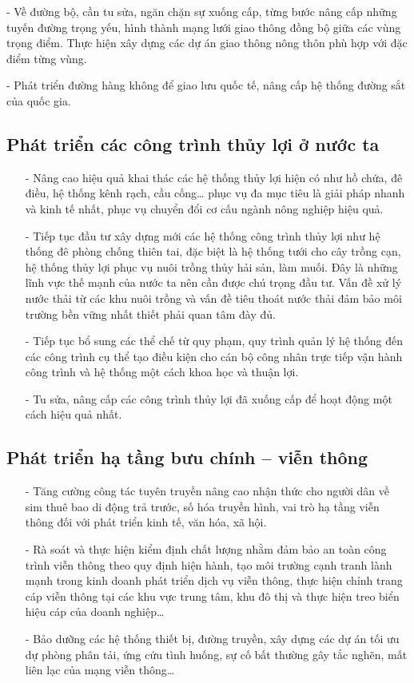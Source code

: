 - Về đường bộ, cần tu sửa, ngăn chặn sự xuống cấp, từng bước nâng cấp những tuyến đường trọng yếu, hình thành mạng lưới giao thông đồng bộ giữa các vùng trọng điểm. Thực hiện  xây dựng các dự án giao thông nông thôn phù hợp với đặc điểm từng vùng.

- Phát triển đường hàng không để giao lưu quốc tế, nâng cấp hệ thống đường sắt của quốc gia.

\subsection{Phát triển các công trình thủy lợi ở nước ta}
\begin{itemize}
\item[-] Nâng cao hiệu quả khai thác các hệ thống thủy lợi hiện có như hồ chứa, đê điều, hệ thống kênh rạch, cầu cống… phục vụ đa mục tiêu là giải pháp nhanh và kinh tế nhất, phục vụ chuyển đổi cơ cấu ngành nông nghiệp hiệu quả. 

\item[-] Tiếp tục đầu tư xây dựng mới các hệ thống công trình thủy lợi như hệ thống đê phòng chống thiên tai, đặc biệt là hệ thống tưới cho cây trồng cạn, hệ thống thủy lợi phục vụ nuôi trồng thủy hải sản, làm muối. Đây là những lĩnh vực thế mạnh của nước ta nên cần được chú trọng đầu tư. Vấn đề xử lý nước thải từ các khu nuôi trồng và vấn đề tiêu thoát nước thải đảm bảo môi trường bền vững nhất thiết phải quan tâm đày đủ.

\item[-] Tiếp tục bổ sung các thể chế từ quy phạm, quy trình quản lý hệ thống đến các công trình cụ thể tạo điều kiện cho cán bộ công nhân trực tiếp vận hành công trình và hệ thống một cách khoa học và thuận lợi.

\item[-] Tu sửa, nâng cấp các công trình thủy lợi đã xuống cấp để hoạt động một cách hiệu quả nhất.
\end{itemize}


\subsection{Phát triển hạ tầng bưu chính – viễn thông}
\begin{itemize}
\item[-] Tăng cường công tác tuyên truyền nâng cao nhận thức cho người dân về sim thuê bao di động trả trước, số hóa truyền hình, vai trò hạ tầng viễn thông đối với phát triển kinh tế, văn hóa, xã hội.

\item[-] Rà soát và thực hiện kiểm định chất lượng nhằm đảm bảo an toàn công trình viễn thông theo quy định hiện hành, tạo môi trường cạnh tranh lành mạnh trong kinh doanh phát triển dịch vụ viễn thông, thực hiện chỉnh trang cáp viễn thông tại các khu vực trung tâm, khu đô thị và thực hiện treo biển hiệu cáp của doanh nghiệp…

\item[-] Bảo dưỡng các hệ thống thiết bị, đường truyền, xây dựng các dự án tối ưu dự phòng phân tải, ứng cứu tình huống, sự cố bất thường gây tắc nghẽn, mất liên lạc của mạng viễn thông…

\end{itemize}

